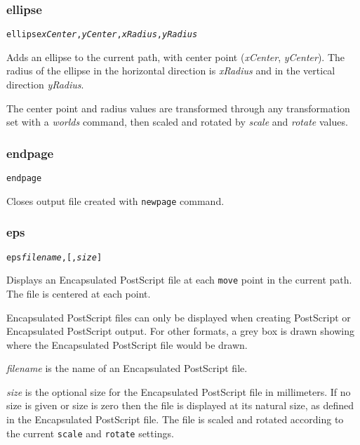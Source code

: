 \subsubsection{ellipse}

\begin{alltt}
ellipse \textit{xCenter}, \textit{yCenter}, \textit{xRadius}, \textit{yRadius}
\end{alltt}

Adds an ellipse to the current path, with center
point (\textit{xCenter}, \textit{yCenter}).  The radius of the ellipse
in the horizontal direction is \textit{xRadius} and in the vertical
direction \textit{yRadius}.

The center point and radius values are transformed through any
transformation set with a \textit{worlds} command,
then scaled and rotated by \textit{scale}
and \textit{rotate} values.

\subsubsection{endpage}

\begin{alltt}
endpage
\end{alltt}

Closes output file created with \texttt{newpage} command.

\subsubsection{eps}

\begin{alltt}
eps \textit{filename}, [, \textit{size}]
\end{alltt}

Displays an Encapsulated PostScript file at each \texttt{move} point in
the current path.  The file is centered at each point.

Encapsulated PostScript files can only be displayed when creating
PostScript or Encapsulated PostScript output.  For other formats,
a grey box is drawn showing where the Encapsulated PostScript file
would be drawn.

\textit{filename} is the name of an Encapsulated PostScript file.

\textit{size} is the optional size for the Encapsulated PostScript file
in millimeters.  If no size
is given or size is zero then the file is displayed at its natural size,
as defined in the Encapsulated PostScript file.
The file is scaled and rotated according to the current \texttt{scale}
and \texttt{rotate} settings.

